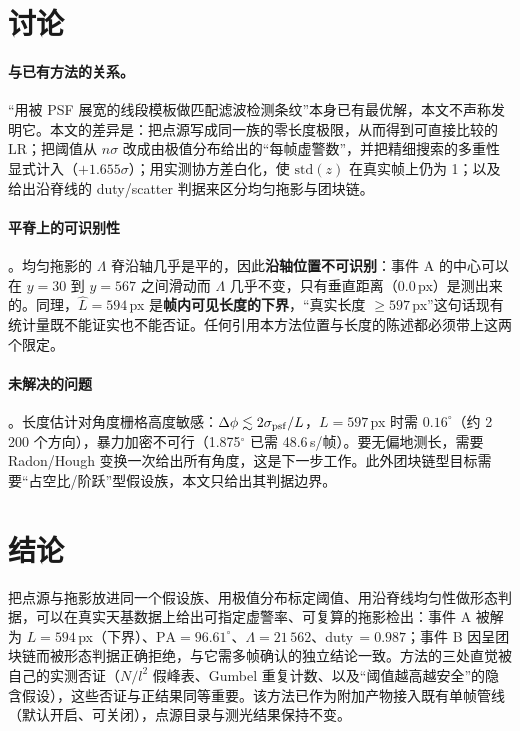 \documentclass[11pt,a4paper]{ctexart}
\newcommand{\Lam}{\ensuremath{\Lambda}}
\begin{document}
\section{讨论}
\paragraph{与已有方法的关系。}“用被 PSF 展宽的线段模板做匹配滤波检测条纹”本身已有最优解\cite{nir2018}，本文不声称发明它。本文的差异是：把点源写成同一族的零长度极限，从而得到可直接比较的 $\mathrm{LR}$；把阈值从 $n\sigma$ 改成由极值分布给出的“每帧虚警数”，并把精细搜索的多重性显式计入（$+1.655\sigma$）；用实测协方差白化，使 $\mathrm{std}(z)$ 在真实帧上仍为 1；以及给出沿脊线的 duty/scatter 判据来区分均匀拖影与团块链。

\paragraph{平脊上的可识别性}\label{sec:limit}。均匀拖影的 $\Lam$ 脊沿轴几乎是平的，因此\textbf{沿轴位置不可识别}：事件 A 的中心可以在 $y=30$ 到 $y=567$ 之间滑动而 $\Lam$ 几乎不变，只有垂直距离（0.0\,px）是测出来的。同理，$\hat L=594$\,px 是\textbf{帧内可见长度的下界}，“真实长度 $\ge597$\,px”这句话现有统计量既不能证实也不能否证。任何引用本方法位置与长度的陈述都必须带上这两个限定。

\paragraph{未解决的问题}。长度估计对角度栅格高度敏感：$\Delta\phi\lesssim2\sigma_{\rm psf}/L$，$L=597$\,px 时需 $0.16^\circ$（约 2\,200 个方向），暴力加密不可行（1.875$^\circ$ 已需 48.6\,s/帧）。要无偏地测长，需要 Radon/Hough 变换一次给出所有角度，这是下一步工作。此外团块链型目标需要“占空比/阶跃”型假设族，本文只给出其判据边界。

\section{结论}
把点源与拖影放进同一个假设族、用极值分布标定阈值、用沿脊线均匀性做形态判据，可以在真实天基数据上给出可指定虚警率、可复算的拖影检出：事件 A 被解为 $L=594$\,px（下界）、$\mathrm{PA}=96.61^\circ$、$\Lam=21\,562$、duty$\,=0.987$；事件 B 因呈团块链而被形态判据正确拒绝，与它需多帧确认的独立结论一致。方法的三处直觉被自己的实测否证（$N/l^2$ 假峰表、Gumbel 重复计数、以及“阈值越高越安全”的隐含假设），这些否证与正结果同等重要。该方法已作为附加产物接入既有单帧管线（默认开启、可关闭），点源目录与测光结果保持不变。
\end{document}
